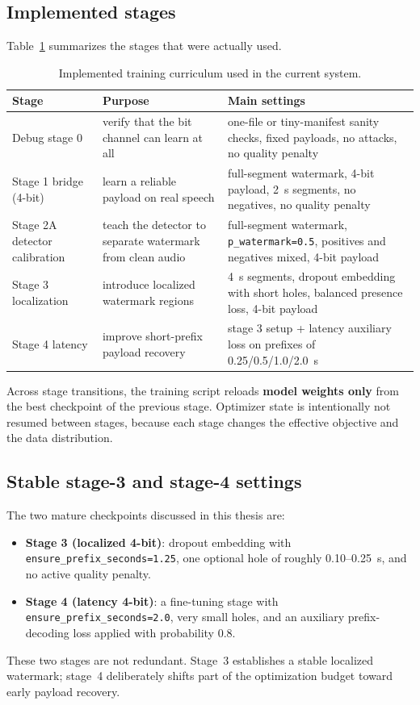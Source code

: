\subsection{Implemented stages}
Table~\ref{tab:curriculum} summarizes the stages that were actually used.

\begin{table}[H]
\centering
\caption{Implemented training curriculum used in the current system.}
\label{tab:curriculum}
\begin{tabular}{p{2.0cm}p{4.2cm}p{7.6cm}}
\toprule
\textbf{Stage} & \textbf{Purpose} & \textbf{Main settings} \\
\midrule
Debug stage 0 & verify that the bit channel can learn at all & one-file or tiny-manifest sanity checks, fixed payloads, no attacks, no quality penalty \\
Stage 1 bridge (4-bit) & learn a reliable payload on real speech & full-segment watermark, 4-bit payload, 2~s segments, no negatives, no quality penalty \\
Stage 2A detector calibration & teach the detector to separate watermark from clean audio & full-segment watermark, \texttt{p\_watermark=0.5}, positives and negatives mixed, 4-bit payload \\
Stage 3 localization & introduce localized watermark regions & 4~s segments, dropout embedding with short holes, balanced presence loss, 4-bit payload \\
Stage 4 latency & improve short-prefix payload recovery & stage 3 setup + latency auxiliary loss on prefixes of 0.25/0.5/1.0/2.0~s \\
\bottomrule
\end{tabular}
\end{table}

Across stage transitions, the training script reloads \textbf{model weights only} from the best checkpoint of the previous stage. Optimizer state is intentionally not resumed between stages, because each stage changes the effective objective and the data distribution.

\subsection{Stable stage-3 and stage-4 settings}
The two mature checkpoints discussed in this thesis are:
\begin{itemize}[leftmargin=1.25em]
  \item \textbf{Stage 3 (localized 4-bit)}: dropout embedding with \texttt{ensure\_prefix\_seconds=1.25}, one optional hole of roughly 0.10--0.25~s, and no active quality penalty.
  \item \textbf{Stage 4 (latency 4-bit)}: a fine-tuning stage with \texttt{ensure\_prefix\_seconds=2.0}, very small holes, and an auxiliary prefix-decoding loss applied with probability 0.8.
\end{itemize}
These two stages are not redundant. Stage~3 establishes a stable localized watermark; stage~4 deliberately shifts part of the optimization budget toward early payload recovery.

